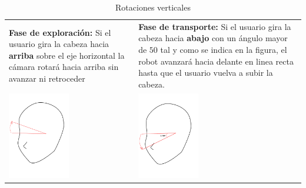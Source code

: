 \documentclass[twoside, 11pt]{epstfg}
\begin{document}
\begin{table}[H]
	\begin{tabular}{p{7.0cm}  p{7.0cm}}
		\textbf{Fase de exploración:} Si el usuario gira la cabeza hacia \textbf{arriba} sobre el eje horizontal la cámara rotará hacia arriba sin avanzar ni retroceder & \textbf{Fase de transporte:} Si el usuario gira la cabeza hacia \textbf{abajo} con un ángulo mayor de $50$ tal y como se indica en la figura, el robot avanzará hacia delante en linea recta hasta que el usuario vuelva a subir la cabeza. \\
		\centering\includegraphics[height=1.5in]{images/movupbuena.png} & \centering\includegraphics[height=1.5in]{images/movdownbuena.png}\\
	\end{tabular}
		\caption{Rotaciones verticales}
		\label{movRobotV}
\end{table}
\end{document}
